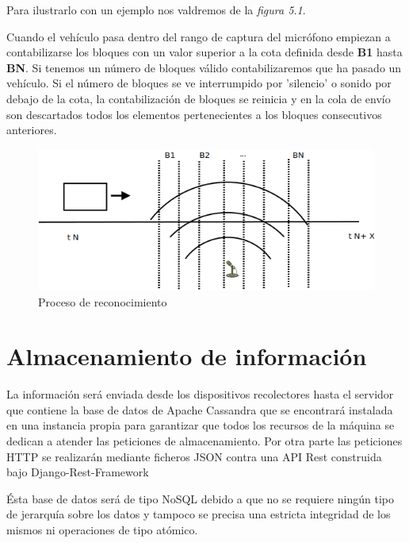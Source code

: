 \begin{itemize}
  Para ilustrarlo con un ejemplo nos valdremos de la \textit{figura 5.1}.

  Cuando el vehículo pasa dentro del rango de captura del micrófono empiezan a contabilizarse los bloques con un valor superior a la cota definida desde \textbf{B1} hasta \textbf{BN}. Si tenemos un número de bloques válido contabilizaremos que ha pasado un vehículo. Si el número de bloques se ve interrumpido por 'silencio' o sonido por debajo de la cota, la contabilización de bloques se reinicia y en la cola de envío son descartados todos los elementos pertenecientes a los bloques consecutivos anteriores.
\end{itemize}
\begin{figure}[!ht]
  \begin{center}
    \includegraphics[scale=0.50]{../images/sound/soun_detect.png}
    \caption{Proceso de reconocimiento}
    \label{fig:recogn}
  \end{center}
\end{figure}

\newpage

\section{Almacenamiento de información}

La información será enviada desde los dispositivos recolectores hasta el servidor que contiene la base de datos de Apache Cassandra que se encontrará instalada en una instancia propia para garantizar que todos los recursos de la máquina se dedican a atender las peticiones de almacenamiento. Por otra parte las peticiones HTTP se realizarán mediante ficheros JSON contra una API Rest construida bajo Django-Rest-Framework

Ésta base de datos será de tipo NoSQL debido a que no se requiere ningún tipo de jerarquía sobre los datos y tampoco se precisa una estricta integridad de los mismos ni operaciones de tipo atómico.

